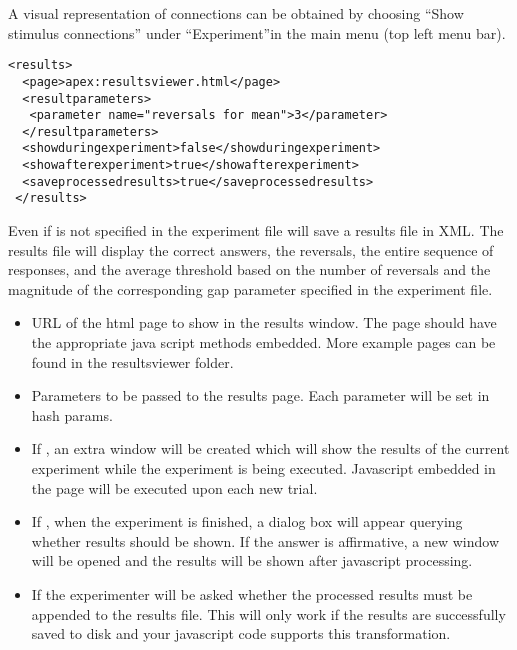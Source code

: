 A visual representation of connections can be obtained by choosing
``Show stimulus connections'' under ``Experiment''in the main
\apex menu (top left menu bar).


\begin{lstlisting}
<results>
  <page>apex:resultsviewer.html</page>
  <resultparameters>
   <parameter name="reversals for mean">3</parameter>
  </resultparameters>
  <showduringexperiment>false</showduringexperiment>
  <showafterexperiment>true</showafterexperiment>
  <saveprocessedresults>true</saveprocessedresults>
 </results>
\end{lstlisting}

 Even if  is not specified in
the experiment file \apex will save a results file in XML. The results file
will display the correct answers, the reversals, the entire
sequence of responses, and the average threshold based on the
number of reversals and the magnitude of the corresponding gap
parameter specified in the experiment file.

\begin{itemize} 
\item {} URL of the html page to show in the results window. The page should have the appropriate java script methods embedded. More example pages can be found in the \apex resultsviewer folder.
\item {} Parameters to be passed to the results page. Each parameter will be set in hash params. 
\item {} If , an extra window will be created which will show the results of the current experiment while the experiment is being executed. Javascript embedded in the page will be executed upon each new trial.
\item {} If , when the experiment is finished, a dialog box will appear querying whether results should be shown. If the answer is affirmative, a new window will be opened and the results will be shown after javascript processing.
\item {} If  the
experimenter will be asked whether the processed results must be
appended to the results file. This will only work if the results are successfully saved to disk and your javascript code supports this transformation.
\end{itemize}

